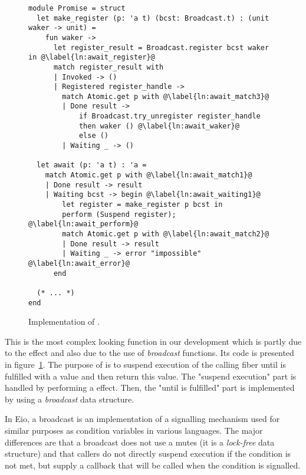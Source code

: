 \subsubsection{}
\label{sec:sched-impl-await}

\begin{figure}[ht]
  \begin{verbatim}
module Promise = struct
  let make_register (p: 'a t) (bcst: Broadcast.t) : (unit waker -> unit) =
    fun waker ->
      let register_result = Broadcast.register bcst waker in @\label{ln:await_register}@
      match register_result with
      | Invoked -> ()
      | Registered register_handle ->
        match Atomic.get p with @\label{ln:await_match3}@
        | Done result ->  
            if Broadcast.try_unregister register_handle
            then waker () @\label{ln:await_waker}@
            else ()
        | Waiting _ -> ()

  let await (p: 'a t) : 'a =
    match Atomic.get p with @\label{ln:await_match1}@
    | Done result -> result
    | Waiting bcst -> begin @\label{ln:await_waiting1}@
        let register = make_register p bcst in
        perform (Suspend register); @\label{ln:await_perform}@
        match Atomic.get p with @\label{ln:await_match2}@
        | Done result -> result 
        | Waiting _ -> error "impossible" @\label{ln:await_error}@
      end
    
  (* ... *)
end
  \end{verbatim}
  \caption{Implementation of .}
  \label{fig:sched-impl-await}
\end{figure}

This is the most complex looking function in our development which is partly due to the \esuspend{} effect and also due to the use of \emph{broadcast} functions.
Its code is presented in figure~\ref{fig:sched-impl-await}.
The purpose of  is to suspend execution of the calling fiber until  is fulfilled with a value and then return this value.
The "suspend execution" part is handled by performing a \esuspend{} effect.
Then, the "until  is fulfilled" part is implemented by using a \emph{broadcast} data structure.

In Eio, a broadcast is an implementation of a signalling mechanism used for similar purposes as condition variables in various languages.
The major differences are that a broadcast does not use a mutes (it is a \emph{lock-free} data structure) and that callers do not directly suspend execution if the condition is not met, but supply a callback that will be called when the condition is signalled.

